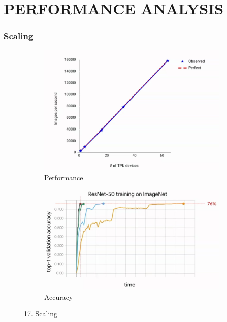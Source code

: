 \documentclass[c]{beamer}
\begin{document}
\section{PERFORMANCE ANALYSIS}
    \begin{frame}
    \frametitle{Scaling}
        \begin{figure}[h]
 \hfill
\begin{subfigure}[b]{0.49\textwidth}
\includegraphics[width=\linewidth]{images/17bscaling.png}
\caption{Performance}
\label{fig:TPUv3 pod}
\end{subfigure}
\begin{subfigure}[b]{0.49\textwidth}
\includegraphics[width=\linewidth]{images/17ascaling.png}
\caption{Accuracy}
\label{fig:TPUv3 Chip}
\end{subfigure}
\caption{17. Scaling }
\label{fig:TPUv3}
\end{figure}
    \end{frame}
\end{document}
